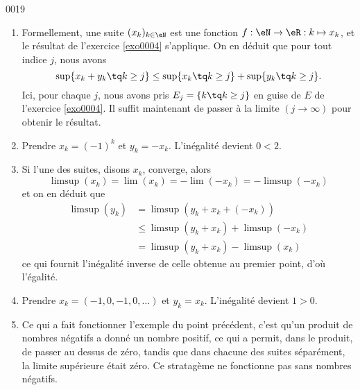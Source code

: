 
\begin{corrige}{0019}

\begin{enumerate}
\item Formellement, une suite $(x_k)_{k\in\eN}$ est une fonction $f : \eN \to \eR : k \mapsto x_k$, et le résultat de l'exercice \ref{exo0004} s'applique. On en déduit que pour tout indice $j$, nous avons
 \begin{equation*}
    \sup\{ x_k + y_k \tq k \geq j \} \leq   \sup\{ x_k \tq k \geq j \} +  \sup\{ y_k \tq k \geq j \}.
  \end{equation*}
Ici, pour chaque $j$, nous avons pris $E_j=\{ k\tq k\geq j \}$ en guise de $E$ de l'exercice \ref{exo0004}. Il suffit maintenant de passer à la limite $(j \to \infty)$ pour obtenir le résultat.
\item
Prendre $x_k = (-1)^k$ et $y_k = -x_k$. L'inégalité devient $0 <
  2$.

\item Si l'une des suites, disons $x_k$, converge, alors
  \begin{equation*}
    \limsup (x_k) = \lim (x_k) = - \lim(-x_k) = - \limsup (-x_k)
  \end{equation*}
  et on en déduit que
  \begin{equation*}
    \begin{split}
      \limsup (y_k) &= \limsup(y_k + x_k + (-x_k))\\
      &\leq \limsup(y_k + x_k) + \limsup (-x_k)\\
      &= \limsup(y_k + x_k) - \limsup (x_k)
    \end{split}
  \end{equation*}
  ce qui fournit l'inégalité inverse de celle obtenue au premier
  point, d'où l'égalité.

\item Prendre $x_k = (-1, 0, -1, 0, \ldots)$ et $y_k =
  x_k$. L'inégalité devient $1 > 0$.

\item 

Ce qui a fait fonctionner l'exemple du point précédent, c'est qu'un produit de nombres négatifs a donné un nombre positif, ce qui a permit, dans le produit,  de passer au dessus de zéro, tandis que dans chacune des suites séparément, la limite supérieure était zéro. Ce stratagème ne fonctionne pas sans nombres négatifs.


\end{enumerate}
\end{corrige}

